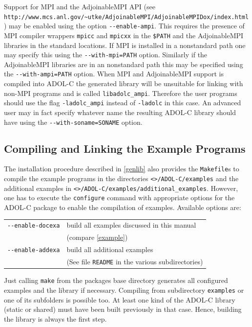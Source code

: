 \documentclass[11pt,twoside]{article}
\begin{document}
Support for MPI and the AdjoinableMPI API (see\\
\verb=http://www.mcs.anl.gov/~utke/AdjoinableMPI/AdjoinableMPIDox/index.html=
) may be enabled using the option \verb=--enable-ampi=. This requires
the presence of MPI compiler wrappers \verb=mpicc= and \verb=mpicxx=
in the \verb=$PATH= and the AdjoinableMPI libraries in the standard
locations. If MPI is installed in a nonstandard path one may specify
this using the \verb?--with-mpi=PATH? option. Similarly if the
AdjoinableMPI libraries are in an nonstandard path this may be
specified using the \verb?--with-ampi=PATH? option.  When MPI and
AdjoinableMPI support is compiled into {\sf ADOL-C} the generated
library will be unsuitable for linking with non-MPI
programs and is called \verb=libadolc_ampi=. Therefore the user
programs should use the flag \verb=-ladolc_ampi= instead of
\verb=-ladolc= in this case. An advanced user may in fact specify
whatever name the resulting {\sf ADOL-C} library should have using the
\verb?--with-soname=SONAME? option.


\subsection{Compiling and Linking the Example Programs}
%
The installation procedure described in \autoref{genlib} also
provides the \verb=Makefile=s  to compile the example programs in the
directories \verb=<=\texttt{\packagetar}\verb=>/ADOL-C/examples= and the
additional examples in
\verb=<=\texttt{\packagetar}\verb=>/ADOL-C/examples/additional_examples=. However,
one has to execute the 
\verb=configure= command with  appropriate options for the ADOL-C package to enable the compilation of
examples. Available options are: 
\begin{center}
\begin{tabular}[t]{ll}
\verb=--enable-docexa=&build all examples discussed in this manual\\
&(compare \autoref{example})\\
\verb=--enable-addexa=&build all additional examples\\
&(See file \verb=README= in the various subdirectories)
\end{tabular}
\end{center}

Just calling \verb=make= from the packages base directory generates
all configured examples and the library if necessary. Compiling from
subdirectory \verb=examples= or one of its subfolders is possible
too. At least one kind of the ADOL-C library (static or shared) must
have been built previously in that case. Hence, building the library
is always the first step. 
\end{document}

